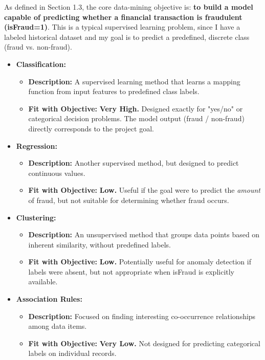 \documentclass[sigplan,screen]{acmart}
\begin{document}
As defined in Section 1.3, the core data-mining objective is: \textbf{to build a model capable of predicting whether a financial transaction is fraudulent (isFraud=1)}. This is a typical supervised learning problem, since I have a labeled historical dataset and my goal is to predict a predefined, discrete class (fraud vs. non-fraud).

\sloppy
\begin{itemize}
    \item \textbf{Classification:}
    \begin{itemize}
        \item \textbf{Description:} A supervised learning method that learns a mapping function from input features to predefined class labels.
        \item \textbf{Fit with Objective:} \textbf{Very High.} Designed exactly for "yes/no" or categorical decision problems. The model output (fraud / non-fraud) directly corresponds to the project goal.
    \end{itemize}
    
    \item \textbf{Regression:}
    \begin{itemize}
        \item \textbf{Description:} Another supervised method, but designed to predict continuous values.
        \item \textbf{Fit with Objective:} \textbf{Low.} Useful if the goal were to predict the \textit{amount} of fraud, but not suitable for determining whether fraud occurs.
    \end{itemize}
    
    \item \textbf{Clustering:}
    \begin{itemize}
        \item \textbf{Description:} An unsupervised method that groups data points based on inherent similarity, without predefined labels.
        \item \textbf{Fit with Objective:} \textbf{Low.} Potentially useful for anomaly detection if labels were absent, but not appropriate when isFraud is explicitly available.
    \end{itemize}
    
    \item \textbf{Association Rules:}
    \begin{itemize}
        \item \textbf{Description:} Focused on finding interesting co-occurrence relationships among data items.
        \item \textbf{Fit with Objective:} \textbf{Very Low.} Not designed for predicting categorical labels on individual records.
    \end{itemize}
\end{itemize}
\fussy
\end{document}
